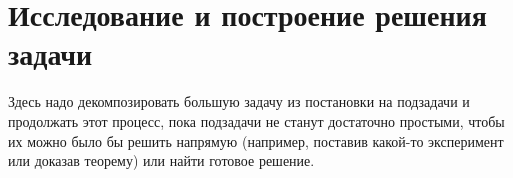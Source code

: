 \section{Исследование и построение решения задачи}
\label{sec:Chapter3} 

\begin{tcolorbox}
    Здесь надо декомпозировать большую задачу из постановки на подзадачи и продолжать этот процесс,
    пока подзадачи не станут достаточно простыми, чтобы их можно было бы решить напрямую 
    (например, поставив какой-то эксперимент или доказав теорему) или найти готовое решение.
\end{tcolorbox}

\newpage
